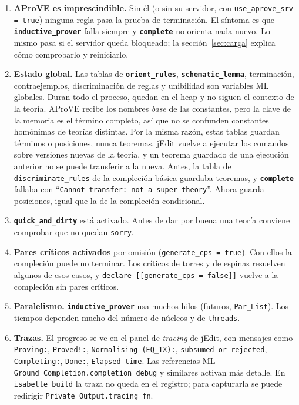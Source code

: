 \documentclass[11pt,a4paper]{article}
\newcommand{\isa}[1]{\texttt{#1}}
\newcommand{\cmd}[1]{\textbf{\texttt{#1}}}
\theoremstyle{definition}
\theoremstyle{remark}
\begin{document}
\begin{enumerate}
  \item \textbf{AProVE es imprescindible.} Sin él (o sin su servidor, con
        \isa{use\_aprove\_srv = true}) ninguna regla pasa la prueba de
        terminación. El síntoma es que \cmd{inductive\_prover} falla siempre y
        \cmd{complete} no orienta nada nuevo. Lo mismo pasa si el servidor queda
        bloqueado; la sección~\ref{sec:carga} explica cómo comprobarlo y reiniciarlo.
  \item \textbf{Estado global.} Las tablas de \cmd{orient\_rules},
        \cmd{schematic\_lemma}, terminación, contraejemplos, discriminación de reglas
        y unibilidad son variables ML globales. Duran todo el proceso, quedan en el
        heap y no siguen el contexto de la teoría. AProVE recibe los nombres
        \emph{base} de las constantes, pero la clave de la memoria es el término
        completo, así que no se confunden constantes homónimas de teorías distintas.
        Por la misma razón, estas tablas guardan términos o posiciones, nunca
        teoremas. jEdit vuelve a ejecutar los comandos sobre versiones nuevas de la
        teoría, y un teorema guardado de una ejecución anterior no se puede
        transferir a la nueva. Antes, la tabla de \isa{discriminate\_rules} de la
        compleción básica guardaba teoremas, y \cmd{complete} fallaba con
        ``\isa{Cannot transfer: not a super theory}''. Ahora guarda posiciones,
        igual que la de la compleción condicional.
  \item \textbf{\isa{quick\_and\_dirty}} está activado. Antes de dar por buena una
        teoría conviene comprobar que no quedan \isa{sorry}.
  \item \textbf{Pares críticos activados} por omisión
        (\isa{generate\_cps = true}). Con ellos la compleción puede no terminar.
        Los críticos de torres y de espinas resuelven algunos de esos casos, y
        \isa{declare [[generate\_cps = false]]} vuelve a la compleción sin pares
        críticos.
  \item \textbf{Paralelismo.} \cmd{inductive\_prover} usa muchos hilos (futuros,
        \isa{Par\_List}). Los tiempos dependen mucho del número de núcleos y de
        \isa{threads}.
  \item \textbf{Trazas.} El progreso se ve en el panel de \emph{tracing} de jEdit,
        con mensajes como \isa{Proving:}, \isa{Proved!:}, \isa{Normalising (EQ\_TX):},
        \isa{subsumed or rejected}, \isa{Completing:}, \isa{Done:},
        \isa{Elapsed time}. Las referencias ML \isa{Ground\_Completion.completion\_debug}
        y similares activan más detalle. En \isa{isabelle build} la traza no queda en
        el registro; para capturarla se puede redirigir
        \isa{Private\_Output.tracing\_fn}.
\end{enumerate}
\end{document}

